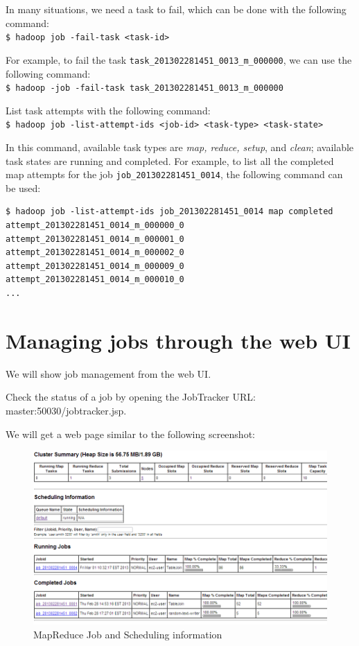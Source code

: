 In many situations, we need a task to fail, which can be done with the following command: \\
\verb|$ hadoop job -fail-task <task-id> |

For example, to fail the task \verb|task_201302281451_0013_m_000000|, we can use the following command: \\ 
\verb|$ hadoop -job -fail-task task_201302281451_0013_m_000000|

List task attempts with the following command: \\
\verb|$ hadoop job -list-attempt-ids <job-id> <task-type> <task-state>|

In this command, available task types are \emph{map, reduce, setup}, and \emph{clean}; available task states are running and completed.
For example, to list all the completed map attempts for the job \verb|job_201302281451_0014|, the following command can be used: 
\begin{verbatim}
$ hadoop job -list-attempt-ids job_201302281451_0014 map completed
attempt_201302281451_0014_m_000000_0
attempt_201302281451_0014_m_000001_0
attempt_201302281451_0014_m_000002_0
attempt_201302281451_0014_m_000009_0
attempt_201302281451_0014_m_000010_0
...
\end{verbatim}

\section{Managing jobs through the web UI}
We will show job management from the web UI.

Check the status of a job by opening the JobTracker URL: master:50030/jobtracker.jsp.

We will get a web page similar to the following screenshot:
\begin{figure}[h]
  \centering
  \includegraphics[width=\textwidth]{figs/5163OS_04_11.png}
  \caption{MapReduce Job and Scheduling information}\label{fig:mapred.status}
\end{figure} 

